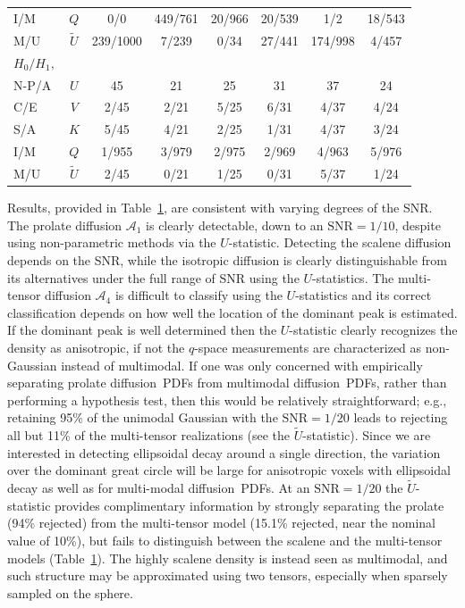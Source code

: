 \documentclass[dvips,aoas,preprint]{imsart}
\numberwithin{equation}{section}
\theoremstyle{plain}
\newcommand{\cA}{\mathcal{A}}
\newcommand{\wt}[1]{\widetilde{#1}}
\begin{document}
{\begin{table}[!htbp]
\begin{tabular}{lccccccc}
I/M& $Q$ & 0/0 & 449/761 & 20/966  & 20/539&1/2  &18/543 \\ 
M/U & $\wt{U}$ & 239/1000 & 7/239 & 0/34 & 27/441 & 174/998  & 4/457\\
      \hline
$H_0/H_1,$  & & & & & & & \\
\hline
N-P/A   & $U$ & 45 & 21 & 25 & 31 & 37 & 24\\ 
C/E & $V$ & 2/45 & 2/21 & 5/25 & 6/31 & 4/37 & 4/24\\
S/A & $K$ & 5/45 & 4/21 & 2/25 & 1/31 & 4/37 & 3/24\\ 
I/M& $Q$ & 1/955 & 3/979 & 2/975  &2/969& 4/963 &5/976 \\ 
      M/U & $\wt{U}$ & 2/45 & 0/21 & 1/25 &0/31  & 5/37  & 1/24\\
      \hline
      \hline
    \end{tabular}
  \label{testing}
\end{table}}

Results, provided in Table~\ref{testing}, are consistent with varying
degrees of the SNR.  The prolate diffusion $\cA_1$ is clearly
detectable, down to an $\text{SNR}=1/10$, despite using non-parametric
methods via the $U$-statistic.  Detecting the scalene diffusion
depends on the SNR, while the isotropic diffusion is clearly
distinguishable from its alternatives under the full range of SNR
using the $U$-statistics.  The multi-tensor diffusion $\cA_4$ is
difficult to classify using the $U$-statistics and its correct
classification depends on how well the location of the dominant peak
is estimated.  If the dominant peak is well determined then the
$U$-statistic clearly recognizes the density as anisotropic, if not
the $q$-space measurements are characterized as non-Gaussian instead
of multimodal.  If one was only concerned with empirically separating
prolate diffusion~PDFs from multimodal diffusion~PDFs, rather than
performing a hypothesis test, then this would be relatively
straightforward; e.g., retaining 95\% of the unimodal Gaussian with
the $\text{SNR}=1/20$ leads to rejecting all but 11\% of the
multi-tensor realizations (see the $\tilde{U}$-statistic).  Since we
are interested in detecting ellipsoidal decay around a single
direction, the variation over the dominant great circle will be large
for anisotropic voxels with ellipsoidal decay as well as for
multi-modal diffusion~PDFs.  At an $\text{SNR}=1/20$ the
$\wt{U}$-statistic provides complimentary information by strongly
separating the prolate (94\% rejected) from the multi-tensor model
(15.1\% rejected, near the nominal value of 10\%), but fails to
distinguish between the scalene and the multi-tensor models
(Table~\ref{testing}).  The highly scalene density is instead seen as
multimodal, and such structure may be approximated using two tensors,
especially when sparsely sampled on the sphere.
\end{document}
